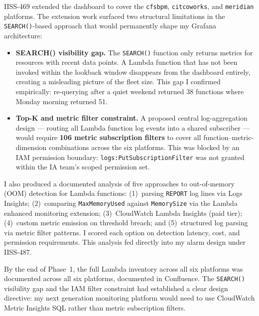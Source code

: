 IISS-469 extended the dashboard to cover the \texttt{cfsbpm}, \texttt{citcoworks},
and \texttt{meridian} platforms. The extension work surfaced two structural
limitations in the \texttt{SEARCH()}-based approach that would permanently shape
my Grafana architecture:

\begin{itemize}
    \item \textbf{SEARCH() visibility gap.} The \texttt{SEARCH()} function only
          returns metrics for resources with recent data points. A Lambda function
          that has not been invoked within the lookback window disappears from the
          dashboard entirely, creating a misleading picture of the fleet size.
          This gap I confirmed empirically: re-querying after a quiet weekend
          returned 38 functions where Monday morning returned 51.

    \item \textbf{Top-K and metric filter constraint.} A proposed central
          log-aggregation design --- routing all Lambda function log events into
          a shared subscriber --- would require \textbf{106 metric subscription
          filters} to cover all function--metric-dimension combinations across the
          six platforms. This was blocked by an IAM permission boundary:
          \texttt{logs:PutSubscriptionFilter} was not granted within the IA team's
          scoped permission set.
\end{itemize}

I also produced a documented analysis of five approaches to out-of-memory
(OOM) detection for Lambda functions: (1)~parsing \texttt{REPORT} log lines via
Logs Insights; (2)~comparing \texttt{MaxMemoryUsed} against \texttt{MemorySize}
via the Lambda enhanced monitoring extension; (3)~CloudWatch Lambda Insights
(paid tier); (4)~custom metric emission on threshold breach; and
(5)~structured log parsing via metric filter patterns. I scored each option
on detection latency, cost, and permission requirements. This analysis fed
directly into my alarm design under IISS-487.

By the end of Phase~1, the full Lambda inventory across all six platforms was documented
across all six platforms, documented in Confluence. The \texttt{SEARCH()}
visibility gap and the IAM filter constraint had established a clear design
directive: my next generation monitoring platform would need to use CloudWatch
Metric Insights SQL rather than metric subscription filters.

